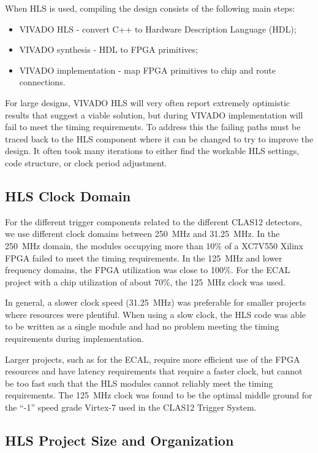 When HLS is used, compiling the design consists of the following main steps:

\begin{itemize}
	\item VIVADO HLS - convert C++ to Hardware Description Language (HDL);
	\item VIVADO synthesis - HDL to FPGA primitives;
	\item VIVADO implementation - map FPGA primitives to chip and route connections.
\end{itemize}

For large designs, VIVADO HLS will very often report extremely optimistic results that suggest a viable solution, but during VIVADO implementation will fail to meet the timing requirements. To address this the failing paths must be traced back to the HLS component where it can be changed to try to improve the design. It often took many iterations to either find the workable HLS settings, code structure, or clock period adjustment.

\subsection{HLS Clock Domain}

For the different trigger components related to the different CLAS12 detectors, we use different clock domains between 250~MHz and 31.25~MHz. In the 250~MHz domain, the modules occupying more than 10\% of a XC7V550 Xilinx FPGA failed to meet the timing requirements. In the 125~MHz and lower frequency domains, the FPGA utilization was close to 100\%. For the ECAL project with a chip utilization of about 70\%, the 125~MHz clock was used.

In general, a slower clock speed (31.25~MHz) was preferable for smaller projects where resources were plentiful. When using a slow clock, the HLS code was able to be written as a single module and had no problem meeting the timing requirements during implementation.

Larger projects, such as for the ECAL, require more efficient use of the FPGA resources and have latency requirements that require a faster clock, but cannot be too fast such that the HLS modules cannot reliably meet the timing requirements. The 125~MHz clock was found to be the optimal middle ground for the ``-1'' speed grade Virtex-7 used in the CLAS12 Trigger System.


\subsection{HLS Project Size and Organization}

